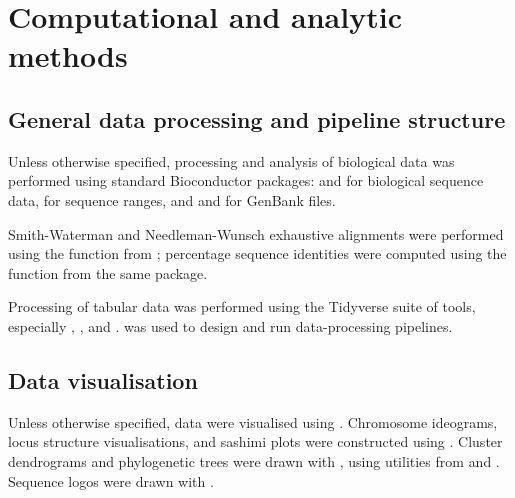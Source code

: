 \newpage
\section{Computational and analytic methods}
\label{sec:methods_comp}

\subsection{General data processing and pipeline structure}
\label{sec:methods_comp_general}

Unless otherwise specified, processing and analysis of biological data was performed using standard Bioconductor \parencite{huber2015bioconductor} packages:  \parencite{pages2017biostrings} and  \parencite{pages2018bsgenome} for biological sequence data,  \parencite{lawrence2013genomicranges} for sequence ranges, and  \parencite{becker2018genbankr} and  \parencite{winter2017rentrez} for GenBank files. 

Smith-Waterman and Needleman-Wunsch exhaustive alignments were performed using the  function from ; percentage sequence identities were computed using the  function from the same package.

Processing of tabular data was performed using the Tidyverse suite of tools, especially  \parencite{wickham2018readr},  \parencite{wickham2018dplyr},  \parencite{wickham2018tidyr} and  \parencite{wickham2018stringr}.  \parencite{koster2012snakemake} was used to design and run data-processing pipelines.

\subsection{Data visualisation}
\label{sec:methods_comp_visualisation}

Unless otherwise specified, data were visualised using  \parencite{wickham2016ggplot2}. Chromosome ideograms, locus structure visualisations, and sashimi plots were constructed using  \parencite{hahne2016gviz}. Cluster dendrograms and phylogenetic trees were drawn with  \parencite{guangchuang2018ggtree}, using utilities from  \parencite{paradis2018ape} and  \parencite{guangchuang2018tidytree}. Sequence logos were drawn with  \parencite{wagih2017ggseqlogo}. 


